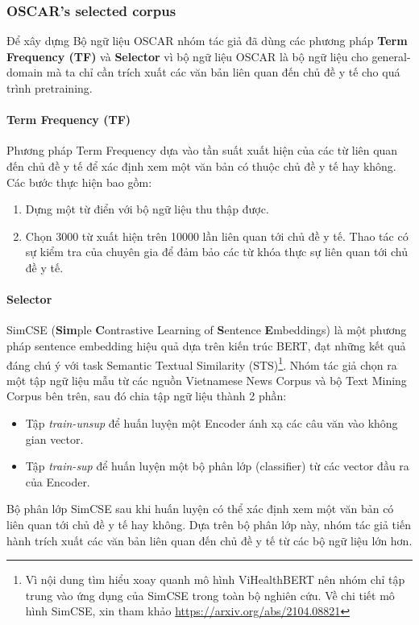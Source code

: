 \subsubsection{OSCAR's selected corpus}
Để xây dựng Bộ ngữ liệu OSCAR\cite{ortiz-suarez-etal-2020-monolingual} nhóm tác giả đã dùng các phương pháp \textbf{Term Frequency (TF)} và \textbf{Selector} vì bộ ngữ liệu OSCAR là bộ ngữ liệu cho general-domain mà ta chỉ cần trích xuất các văn bản liên quan đến chủ đề y tế cho quá trình pretraining.

\paragraph{Term Frequency (TF)}
Phương pháp Term Frequency dựa vào tần suất xuất hiện của các từ liên quan đến chủ đề y tế để xác định xem một văn bản có thuộc chủ đề y tế hay không. Các bước thực hiện bao gồm:
\begin{enumerate}
\item Dựng một từ điển với bộ ngữ liệu thu thập được.
\item Chọn 3000 từ xuất hiện trên 10000 lần liên quan tới chủ đề y tế. Thao tác có sự kiểm tra của chuyên gia để đảm bảo các từ khóa thực sự liên quan tới chủ đề y tế.
\end{enumerate}

\paragraph{Selector}
SimCSE (\textbf{Sim}ple \textbf{C}ontrastive Learning of \textbf{S}entence \textbf{E}mbeddings)\cite{simcse2021} là một phương pháp sentence embedding hiệu quả dựa trên kiến trúc BERT, đạt những kết quả đáng chú ý với task Semantic Textual Similarity (STS)\footnote{Vì nội dung tìm hiểu xoay quanh mô hình ViHealthBERT nên nhóm chỉ tập trung vào ứng dụng của SimCSE trong toàn bộ nghiên cứu. Về chi tiết mô hình SimCSE, xin tham khảo \href{https://arxiv.org/abs/2104.08821}{https://arxiv.org/abs/2104.08821}}. Nhóm tác giả chọn ra một tập ngữ liệu mẫu từ các nguồn Vietnamese News Corpus và bộ Text Mining Corpus bên trên, sau đó chia tập ngữ liệu thành 2 phần: 
\begin{itemize}
\item Tập \textit{train-unsup} để huấn luyện một Encoder ánh xạ các câu văn vào không gian vector.
\item Tập \textit{train-sup} để huấn luyện một bộ phân lớp (classifier) từ các vector đầu ra của Encoder.
\end{itemize}
Bộ phân lớp SimCSE sau khi huấn luyện có thể xác định xem một văn bản có liên quan tới chủ đề y tế hay không. Dựa trên bộ phân lớp này, nhóm tác giả tiến hành trích xuất các văn bản liên quan đến chủ đề y tế từ các bộ ngữ liệu lớn hơn.

